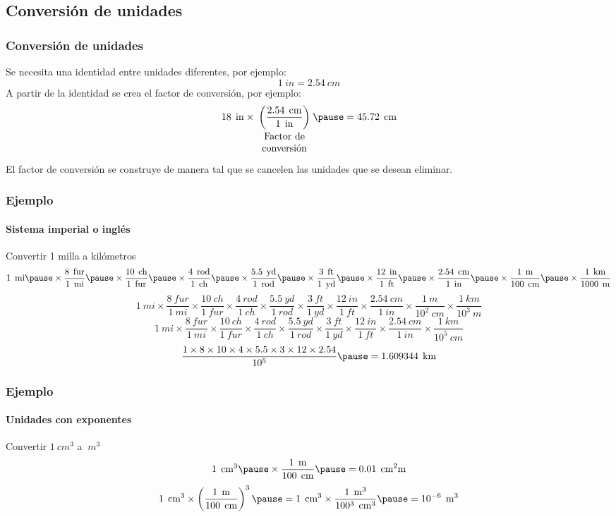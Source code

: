 \documentclass[
    aspectratio=169, %
    ]{beamer}
\newcommand{\minitab}[2][]{\begin{tabular}{#1}#2\end{tabular}}
\let\oldunit\unit
\renewcommand{\unit}[1]{\:\oldunit{#1}}
\newcommand{\then}{\pause =}
\begin{document}
\subsection{Conversión de unidades}
\begin{frame}
    \frametitle{Conversión de unidades} \pause
    Se necesita una identidad entre unidades diferentes\pause, por ejemplo:
    \[1\unit{in} = 2.54\unit{cm}\]\pause
    A partir de la identidad se crea el factor de conversión\pause, por ejemplo:
    \[18\unit{in}\times\underset{\minitab[c]{Factor de\\ conversión}}{\left(\frac{2.54\unit{cm}}{1\unit{in}}\right)} \then 45.72\unit{cm} \] \pause
    El factor de conversión se construye de manera tal que se cancelen las unidades que se desean eliminar.
\end{frame}
\begin{frame}
    \frametitle{Ejemplo} \framesubtitle{Sistema imperial o inglés}\pause
    Convertir 1 milla a kilómetros \pause
    \[1 \unit{mi} \pause\times\frac{8 \unit{fur}}{1 \unit{mi}}\pause\times\frac{10 \unit{ch}}{1 \unit{fur}}\pause\times\frac{4 \unit{rod}}{1 \unit{ch}}\pause\times\frac{5.5 \unit{yd}}{1 \unit{rod}}\pause\times\frac{3 \unit{ft}}{1 \unit{yd}}\pause\times\frac{12 \unit{in}}{1 \unit{ft}}\pause\times\frac{2.54 \unit{cm}}{1 \unit{in}}\pause\times\frac{1 \unit{m}}{100 \unit{cm}}\pause\times\frac{1 \unit{km}}{1000 \unit{m}}\]\pause
    \[1 \unit{mi} \times\frac{8 \unit{fur}}{1 \unit{mi}}\times\frac{10 \unit{ch}}{1 \unit{fur}}\times\frac{4 \unit{rod}}{1 \unit{ch}}\times\frac{5.5 \unit{yd}}{1 \unit{rod}}\times\frac{3 \unit{ft}}{1 \unit{yd}}\times\frac{12 \unit{in}}{1 \unit{ft}}\times\frac{2.54 \unit{cm}}{1 \unit{in}}\times\frac{1 \unit{m}}{10^2 \unit{cm}}\times\frac{1 \unit{km}}{10^3 \unit{m}}\]\pause
    \[1 \unit{mi} \times\frac{8 \unit{fur}}{1 \unit{mi}}\times\frac{10 \unit{ch}}{1 \unit{fur}}\times\frac{4 \unit{rod}}{1 \unit{ch}}\times\frac{5.5 \unit{yd}}{1 \unit{rod}}\times\frac{3 \unit{ft}}{1 \unit{yd}}\times\frac{12 \unit{in}}{1 \unit{ft}}\times\frac{2.54 \unit{cm}}{1 \unit{in}}\times\frac{1 \unit{km}}{10^5 \unit{cm}}\]\pause
    \[\frac {1 \times 8 \times 10 \times 4 \times 5.5 \times 3 \times 12 \times 2.54}{10^5} \then 1.609344 \unit{km}\]
\end{frame}
\begin{frame}
    \frametitle{Ejemplo} \framesubtitle{Unidades con exponentes}\pause
    Convertir $1 \unit{cm^3}$ a $\unit{m^3}$ \pause
    \[1\unit{cm^3} \pause\times \frac{1 \unit{m}}{100 \unit{cm}} \then 0.01 \unit{cm^2 m}\]\pause
    \[1\unit{cm^3} \times \left(\frac{1 \unit{m}}{100 \unit{cm}}\right)^3 \then 1\unit{cm^3} \times \frac{1 \unit{m^3}}{100^3 \unit{cm}^3} \then 10^{-6} \unit{m^3}\]
\end{frame}
\end{document}
